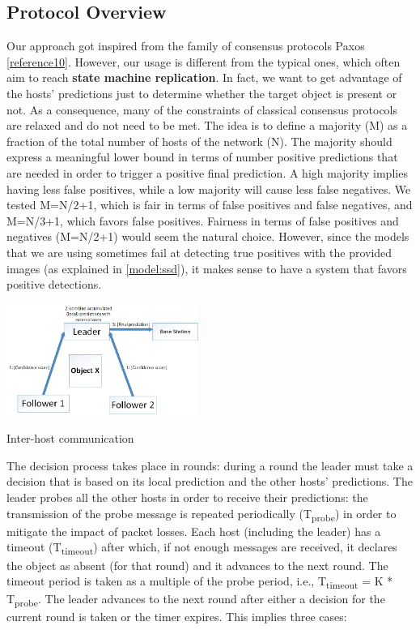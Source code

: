 \documentclass[10pt,conference,compsocconf]{IEEEtran}
\begin{document}
\begin{enumerate}
\subsection{Protocol Overview}
\label{subsec:protooverview}
Our approach got inspired from the family of consensus protocols Paxos \ref{reference10}. However, our usage is different from the typical ones, which often aim to reach \textbf{state machine replication}. In fact, we want to get advantage of the hosts' predictions just to determine whether the target object is present or not. As a consequence, many of the constraints of classical consensus protocols are relaxed and do not need to be met. The idea is to define a majority (M) as a fraction of the total number of hosts of the network (N). The majority should express a meaningful lower bound in terms of number positive predictions that are needed in order to trigger a positive final prediction. A high majority implies having less false positives, while a low majority will cause less false negatives. We tested M=N/2+1, which is fair in terms of false positives and false negatives, and M=N/3+1, which favors false positives.
Fairness in terms of false positives and negatives (M=N/2+1) would seem the natural choice.
However, since the models that we are using sometimes fail at detecting true positives with the provided images (as explained in \ref{model:ssd}), it makes sense to have a system that favors positive detections.
\begin{center}
	\captionsetup{type=figure}
	\includegraphics[width=0.47\textwidth]{img/protocol_sketch_inter_host.jpg}
	\caption {Inter-host communication}
	\label{fig:inter_host}
\end{center}
The decision process takes place in rounds: during a round the leader must take a decision that is based on its local prediction and the other hosts' predictions. The leader probes all the other hosts in order to receive their predictions: the transmission of the probe message is repeated periodically (T\textsubscript{probe}) in order to mitigate the impact of packet losses. Each host (including the leader) has a timeout (T\textsubscript{timeout}) after which, if not enough messages are received, it declares the object as absent (for that round) and it advances to the next round. The timeout period is taken as a multiple of the probe period, i.e., T\textsubscript{timeout} = K * T\textsubscript{probe}. The leader advances to the next round after either a decision for the current round is taken or the timer expires. This implies three cases:

\end{enumerate}
\end{document}
